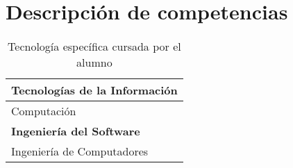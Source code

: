 \chapter{Descripción de competencias}

\begin{table}[hp]
  \centering
  \label{tab:tec-especifica}
  \begin{tabular}{p{}}
    \hline
    \rowcolor{gray!25} Tecnologías de la Información \\
    \hline
    Computación \\
    \hline
    \rowcolor{yellow} \textbf{Ingeniería del Software} \\
    \hline
    Ingeniería de Computadores \\
    \hline
  \end{tabular}
    \caption{Tecnología específica cursada por el alumno}
\end{table}

\newpage

